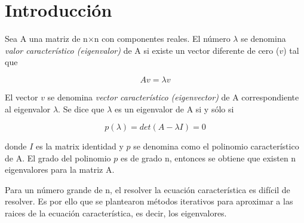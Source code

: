 \section{Introducción}

Sea A una matriz de n$\times$n con componentes reales. El número $\lambda$ se denomina \textit{valor característico (eigenvalor)} de A si existe un vector diferente de cero ($v$) tal que

\begin{equation}
    Av = \lambda v \label{eq:equation_eigenvalores}
\end{equation}

El vector $v$ se denomina \textit{vector característico (eigenvector)} de A correspondiente al eigenvalor $\lambda$. Se dice que $\lambda$ es un eigenvalor de A si y sólo si

\begin{equation}
    p(\lambda) = det(A - \lambda I) = 0 \label{eq:polinomio}
\end{equation}

donde $I$ es la matrix identidad y $p$ se denomina como el polinomio característico de A. El grado del polinomio $p$ es de grado n, entonces se obtiene que existen n eigenvalores para la matriz A.

Para un número grande de n, el resolver la ecuación característica es difícil de resolver. Es por ello que se plantearon métodos iterativos para aproximar a las raices de la ecuación característica, es decir, los eigenvalores.